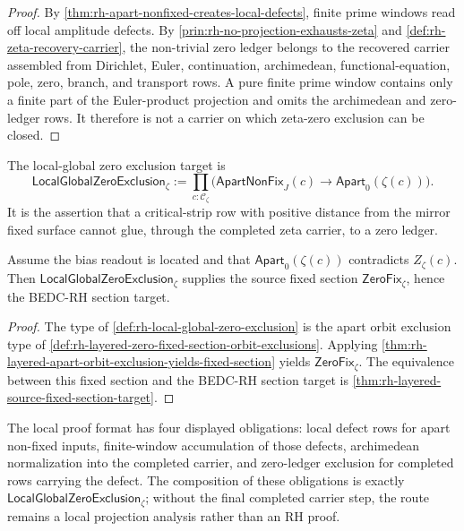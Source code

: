 \begin{proof}
By \autoref{thm:rh-apart-nonfixed-creates-local-defects}, finite prime
windows read off local amplitude defects. By
\autoref{prin:rh-no-projection-exhausts-zeta} and
\autoref{def:rh-zeta-recovery-carrier}, the non-trivial zero ledger belongs
to the recovered carrier assembled from Dirichlet, Euler, continuation,
archimedean, functional-equation, pole, zero, branch, and transport rows.
A pure finite prime window contains only a finite part of the Euler-product
projection and omits the archimedean and zero-ledger rows. It therefore is
not a carrier on which zeta-zero exclusion can be closed.
\end{proof}

\begin{definition}
\label{def:rh-local-global-zero-exclusion}
The local-global zero exclusion target is
$$
\mathsf{LocalGlobalZeroExclusion}_{\zeta}
:=
\prod_{c:\mathcal C_{\zeta}}
\bigl(
\mathsf{ApartNonFix}_{J}(c)
\to
\mathsf{Apart}_{0}(\zeta(c))
\bigr).
$$
It is the assertion that a critical-strip row with positive distance from
the mirror fixed surface cannot glue, through the completed zeta carrier,
to a zero ledger.
\end{definition}

\begin{theorem}
\label{thm:rh-local-global-zero-exclusion-proof-target}
Assume the bias readout is located and that
$\mathsf{Apart}_{0}(\zeta(c))$ contradicts $Z_{\zeta}(c)$. Then
$\mathsf{LocalGlobalZeroExclusion}_{\zeta}$ supplies the source fixed
section $\mathsf{ZeroFix}_{\zeta}$, hence the BEDC-RH section target.
\end{theorem}

\begin{proof}
The type of \autoref{def:rh-local-global-zero-exclusion} is the apart orbit
exclusion type of
\autoref{def:rh-layered-zero-fixed-section-orbit-exclusions}. Applying
\autoref{thm:rh-layered-apart-orbit-exclusion-yields-fixed-section} yields
$\mathsf{ZeroFix}_{\zeta}$. The equivalence between this fixed section and
the BEDC-RH section target is
\autoref{thm:rh-layered-source-fixed-section-target}.
\end{proof}

\begin{principle}
\label{prin:rh-local-global-proof-format}
The local proof format has four displayed obligations: local defect rows
for apart non-fixed inputs, finite-window accumulation of those defects,
archimedean normalization into the completed carrier, and zero-ledger
exclusion for completed rows carrying the defect. The composition of these
obligations is exactly
$\mathsf{LocalGlobalZeroExclusion}_{\zeta}$; without the final completed
carrier step, the route remains a local projection analysis rather than an
RH proof.
\end{principle}

